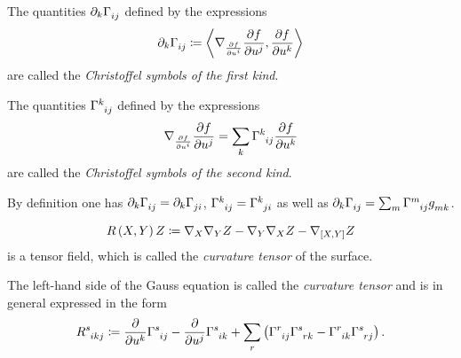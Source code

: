 \documentclass[../main.tex]{subfiles}
\begin{document}
\begin{definition}\label{Manifold:ChristoffelSymbol}
\;\newline
\begin{APAenumerate}
\item The quantities \(\partial_k\tensor{\Gamma}{_i_j}\) defined by the expressions
\[
\partial_k\tensor{\Gamma}{_i_j}
\coloneqq
\inner{\nabla_{\frac{\partial f}{\partial\tensor{u}{^i}}}\frac{\partial f}{\partial\tensor{u}{^j}}}{\frac{\partial f}{\partial\tensor{u}{^k}}}
\]
are called the \textit{Christoffel symbols of the first kind}.
\item The quantities \(\tensor{\Gamma}{^k_i_j}\) defined by the expressions
\[
\nabla_{\frac{\partial f}{\partial\tensor{u}{^i}}}\frac{\partial f}{\partial\tensor{u}{^j}}
=
\sum_k{\tensor{\Gamma}{^k_i_j}\frac{\partial f}{\partial\tensor{u}{^k}}}
\]
are called the \textit{Christoffel symbols of the second kind}.
\item By definition one has \(\partial_k\tensor{\Gamma}{_i_j}=\partial_k\tensor{\Gamma}{_j_i}\), \(\tensor{\Gamma}{^k_i_j}=\tensor{\Gamma}{^k_j_i}\)
as well as \(\partial_k\tensor{\Gamma}{_i_j}=\sum_{m}\tensor{\Gamma}{^m_i_j}\tensor{g}{_m_k}\).
\end{APAenumerate}
\end{definition}
\begin{definition}\label{Manifold:CurvatureTensor}
\[
R\left(X,Y\right)Z
\coloneqq
\nabla_X\nabla_YZ - \nabla_Y\nabla_XZ - \nabla_{\left[{X},{Y}\right]}Z
\]
is a tensor field, which is called the \textit{curvature tensor} of the surface.
\end{definition}
\begin{remark}\label{Manifold:CurvatureTensor:ChristoffelSymbol}
The left-hand side of the Gauss equation is called the \textit{curvature tensor}
and is in general expressed in the form
\[
\tensor{R}{^s_i_k_j}
\coloneqq
\frac{\partial}{\partial\tensor{u}{^k}}\tensor{\Gamma}{^s_i_j}
- \frac{\partial}{\partial\tensor{u}{^j}}\tensor{\Gamma}{^s_i_k}
+ \sum_{r}\left(\tensor{\Gamma}{^r_i_j}\tensor{\Gamma}{^s_r_k}-\tensor{\Gamma}{^r_i_k}\tensor{\Gamma}{^s_r_j}\right) \text{.}
\]
\end{remark}
\end{document}
